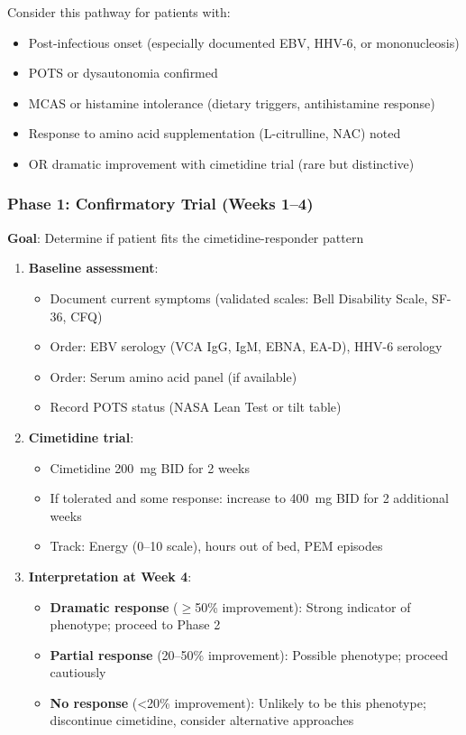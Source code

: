 Consider this pathway for patients with:
\begin{itemize}
    \item Post-infectious onset (especially documented EBV, HHV-6, or mononucleosis)
    \item POTS or dysautonomia confirmed
    \item MCAS or histamine intolerance (dietary triggers, antihistamine response)
    \item Response to amino acid supplementation (L-citrulline, NAC) noted
    \item OR dramatic improvement with cimetidine trial (rare but distinctive)
\end{itemize}

\subsubsection{Phase 1: Confirmatory Trial (Weeks 1--4)}

\textbf{Goal}: Determine if patient fits the cimetidine-responder pattern

\begin{enumerate}
    \item \textbf{Baseline assessment}:
    \begin{itemize}
        \item Document current symptoms (validated scales: Bell Disability Scale, SF-36, CFQ)
        \item Order: EBV serology (VCA IgG, IgM, EBNA, EA-D), HHV-6 serology
        \item Order: Serum amino acid panel (if available)
        \item Record POTS status (NASA Lean Test or tilt table)
    \end{itemize}

    \item \textbf{Cimetidine trial}:
    \begin{itemize}
        \item Cimetidine 200~mg BID for 2 weeks
        \item If tolerated and some response: increase to 400~mg BID for 2 additional weeks
        \item Track: Energy (0--10 scale), hours out of bed, PEM episodes
    \end{itemize}

    \item \textbf{Interpretation at Week 4}:
    \begin{itemize}
        \item \textbf{Dramatic response} ($\geq$50\% improvement): Strong indicator of phenotype; proceed to Phase 2
        \item \textbf{Partial response} (20--50\% improvement): Possible phenotype; proceed cautiously
        \item \textbf{No response} (<20\% improvement): Unlikely to be this phenotype; discontinue cimetidine, consider alternative approaches
    \end{itemize}
\end{enumerate}

